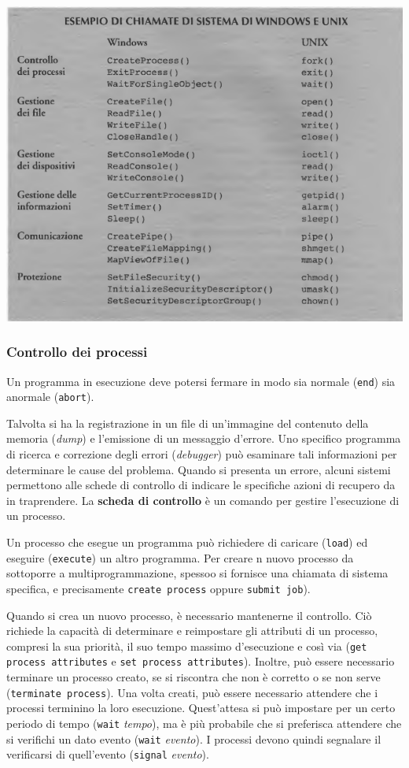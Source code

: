 \documentclass[11pt,a4paper]{article}
\begin{document}
\begin{center}
  \includegraphics[scale=0.55]{img/0002.png}
\end{center}

\subsubsection{Controllo dei processi}
Un programma in esecuzione deve potersi fermare in modo sia normale (\texttt{end}) sia anormale (\texttt{abort}).

Talvolta si ha la registrazione in un file di un'im­magine del contenuto della memoria (\emph{dump}) e l'emissione di un messaggio d'errore. Uno specifico programma di ricerca e correzione degli errori (\emph{debugger}) può esaminare tali infor­mazioni per determinare le cause del problema.
Quando si presenta un errore, alcuni
sistemi permettono alle schede di controllo di indicare le specifiche azioni di recupero da in­
traprendere. La \textbf{scheda di controllo} è un comando per gestire l'esecuzione di un processo.

Un processo che esegue un programma può richiedere di caricare (\texttt{load}) ed eseguire
(\texttt{execute}) un altro programma.
Per creare n nuovo processo da sottoporre a multiprogrammazione, spessoo si fornisce una chiamata di siste­ma specifica, e precisamente \texttt{create process} oppure \texttt{submit job}).

Quando si crea un nuovo processo, è necessario mante­nerne il controllo. Ciò richiede la capacità di determinare e reimpostare gli attributi di un processo, compresi la sua priorità, il suo tempo massimo d'esecuzione e così via (\texttt{get process attributes} e \texttt{set process attributes}). Inoltre, può essere necessario terminare un
processo creato, se si riscontra che non è corretto o se non serve (\texttt{terminate process}).
Una volta creati, può essere necessario attendere che i processi terminino la loro esecu­zione. Quest'attesa si può impostare per un certo periodo di tempo (\texttt{wait} \emph{tempo}), ma è
più probabile che si preferisca attendere che si verifichi un dato evento (\texttt{wait} \emph{evento}). I processi devono quindi segnalare il verificarsi di quell'evento (\texttt{signal} \emph{evento}).
\end{document}
